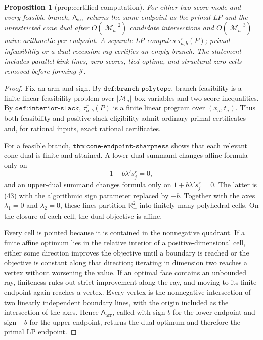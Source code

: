 \documentclass{article}
\newtheorem{proposition}{Proposition}
\begin{document}
\begin{proposition}[prop:certified-computation]\label{prop:certified-computation}
For either two-score mode and every feasible branch, \(\mathsf A_{\mathrm{arr}}\) returns the same endpoint as the primal LP and the unrestricted cone dual after \(O(|\mathcal M_a|^2)\) candidate intersections and \(O(|\mathcal M_a|^3)\) naive arithmetic per endpoint. A separate LP computes \(\tau_{a,b}^r(P)\); primal infeasibility or a dual recession ray certifies an empty branch. The statement includes parallel kink lines, zero scores, tied optima, and structural-zero cells removed before forming \(\mathcal J\).
\end{proposition}
\begin{proof}
Fix an arm and sign.  By \(\texttt{def:branch-polytope}\), branch feasibility is a finite linear feasibility problem over \(|\mathcal M_a|\) box variables and two score inequalities.  By \(\texttt{def:interior-slack}\), \(\tau_{a,b}^r(P)\) is a finite linear program over \((x_a,t_a)\).  Thus both feasibility and positive-slack eligibility admit ordinary primal certificates and, for rational inputs, exact rational certificates.

For a feasible branch, \(\texttt{thm:cone-endpoint-sharpness}\) shows that each relevant cone dual is finite and attained.  A lower-dual summand changes affine formula only on
\[
 1-b\lambda's_j^r=0,                                                          \tag{43}
\]
and an upper-dual summand changes formula only on \(1+b\lambda's_j^r=0\).  The latter is (43) with the algorithmic sign parameter replaced by \(-b\).  Together with the axes \(\lambda_1=0\) and \(\lambda_2=0\), these lines partition \(\mathbb R_+^2\) into finitely many polyhedral cells.  On the closure of each cell, the dual objective is affine.

Every cell is pointed because it is contained in the nonnegative quadrant.  If a finite affine optimum lies in the relative interior of a positive-dimensional cell, either some direction improves the objective until a boundary is reached or the objective is constant along that direction; iterating in dimension two reaches a vertex without worsening the value.  If an optimal face contains an unbounded ray, finiteness rules out strict improvement along the ray, and moving to its finite endpoint again reaches a vertex.  Every vertex is the nonnegative intersection of two linearly independent boundary lines, with the origin included as the intersection of the axes.  Hence \(\mathsf A_{\mathrm{arr}}\), called with sign \(b\) for the lower endpoint and sign \(-b\) for the upper endpoint, returns the dual optimum and therefore the primal LP endpoint.


\end{proof}
\end{document}
